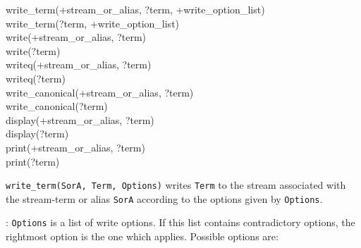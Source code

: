 \begin{TemplatesOneCol}
write\_term(+stream\_or\_alias, ?term, +write\_option\_list)\\
write\_term(?term, +write\_option\_list)\\
write(+stream\_or\_alias, ?term)\\
write(?term)\\
writeq(+stream\_or\_alias, ?term)\\
writeq(?term)\\
write\_canonical(+stream\_or\_alias, ?term)\\
write\_canonical(?term)\\
display(+stream\_or\_alias, ?term)\\
display(?term)\\
print(+stream\_or\_alias, ?term)\\
print(?term)

\end{TemplatesOneCol}

\Description

\texttt{write\_term(SorA, Term, Options)} writes
\texttt{Term} to the stream associated with the stream-term or alias
\texttt{SorA} according to the options given by \texttt{Options}.

: \texttt{Options} is a list of write options. If this
list contains contradictory options, the rightmost option is the one which
applies. Possible options are:

